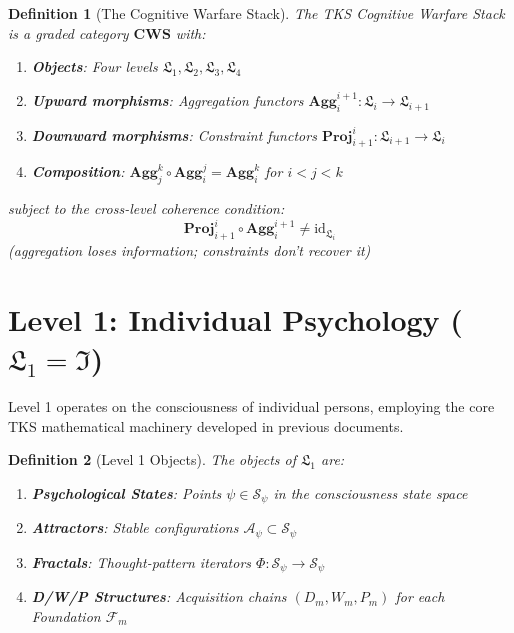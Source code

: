 \documentclass[11pt,twoside]{book}
\newcommand{\Foundations}{\mathcal{F}}
\newcommand{\Frac}{\Phi}
\newcommand{\Level}[1]{\mathfrak{L}_{#1}}
\newcommand{\Individual}{\mathfrak{I}}
\newcommand{\PsychAttractor}{\mathcal{A}_\psi}
\newcommand{\Aggregate}[2]{\mathbf{Agg}_{#1}^{#2}}
\newcommand{\Project}[2]{\mathbf{Proj}_{#1}^{#2}}
\newtheorem{definition}{Definition}[chapter]
\begin{document}
\begin{definition}[The Cognitive Warfare Stack]
\label{def:cw-stack}
The \emph{TKS Cognitive Warfare Stack} is a graded category $\mathbf{CWS}$ with:
\begin{enumerate}[label=(\roman*)]
    \item \textbf{Objects}: Four levels $\Level{1}, \Level{2}, \Level{3}, \Level{4}$
    \item \textbf{Upward morphisms}: Aggregation functors $\Aggregate{i}{i+1} : \Level{i} \to \Level{i+1}$
    \item \textbf{Downward morphisms}: Constraint functors $\Project{i+1}{i} : \Level{i+1} \to \Level{i}$
    \item \textbf{Composition}: $\Aggregate{j}{k} \circ \Aggregate{i}{j} = \Aggregate{i}{k}$ for $i < j < k$
\end{enumerate}
subject to the \emph{cross-level coherence condition}:
\[
    \Project{i+1}{i} \circ \Aggregate{i}{i+1} \neq \mathrm{id}_{\Level{i}}
\]
(aggregation loses information; constraints don't recover it)
\end{definition}

\section{Level 1: Individual Psychology ($\Level{1} = \Individual$)}

Level 1 operates on the consciousness of individual persons, employing the
core TKS mathematical machinery developed in previous documents.

\begin{definition}[Level 1 Objects]
\label{def:L1-objects}
The objects of $\Level{1}$ are:
\begin{enumerate}[label=(\alph*)]
    \item \textbf{Psychological States}: Points $\psi \in \mathcal{S}_\psi$ in the
          consciousness state space
    \item \textbf{Attractors}: Stable configurations $\PsychAttractor \subset \mathcal{S}_\psi$
    \item \textbf{Fractals}: Thought-pattern iterators $\Frac : \mathcal{S}_\psi \to \mathcal{S}_\psi$
    \item \textbf{D/W/P Structures}: Acquisition chains $(D_m, W_m, P_m)$ for each
          Foundation $\Foundations_m$
\end{enumerate}
\end{definition}
\end{document}
